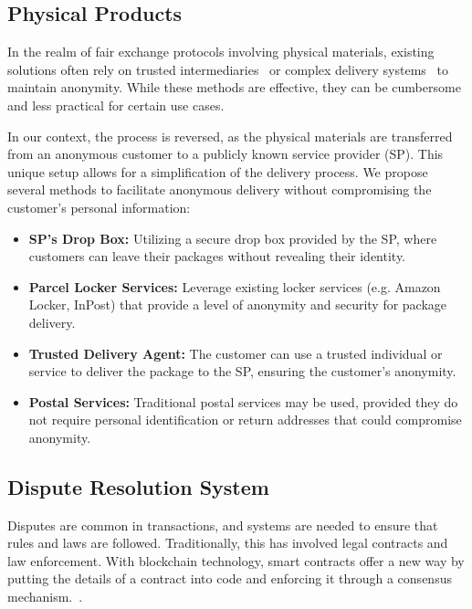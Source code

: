 \documentclass[pdftex,twocolumn,epjc3]{svjour3}
\begin{document}
\subsection{Physical Products}\label{sec:physical-products}
In the realm of fair exchange protocols involving physical materials, existing solutions often rely on trusted intermediaries~\cite{mohammedalarajFairnessPhysicalProducts2012, birjoveanuAnonymityFairexchangeEcommerce2015} or complex delivery systems~\cite{altawyLelantosBlockchainBasedAnonymous2017} to maintain anonymity. While these methods are effective, they can be cumbersome and less practical for certain use cases.

In our context, the process is reversed, as the physical materials are transferred from an anonymous customer to a publicly known service provider (SP). This unique setup allows for a simplification of the delivery process. We propose several methods to facilitate anonymous delivery without compromising the customer's personal information:

\begin{itemize}
    \item \textbf{SP's Drop Box:} Utilizing a secure drop box provided by the SP, where customers can leave their packages without revealing their identity.
    
    \item \textbf{Parcel Locker Services:} Leverage existing locker services (e.g. Amazon Locker, InPost) that provide a level of anonymity and security for package delivery.
    
    \item \textbf{Trusted Delivery Agent:} The customer can use a trusted individual or service to deliver the package to the SP, ensuring the customer's anonymity.
    
    \item \textbf{Postal Services:} Traditional postal services may be used, provided they do not require personal identification or return addresses that could compromise anonymity.
\end{itemize}

\subsection{Dispute Resolution System}
\label{sec:dispute-resolution}
\begin{sloppypar}
Disputes are common in transactions, and systems are needed to ensure that rules and laws are followed. Traditionally, this has involved legal contracts and law enforcement. With blockchain technology, smart contracts offer a new way by putting the details of a contract into code and enforcing it through a consensus mechanism.~\cite{allenGovernanceBlockchainDispute2019}.
\end{sloppypar}
\end{document}
